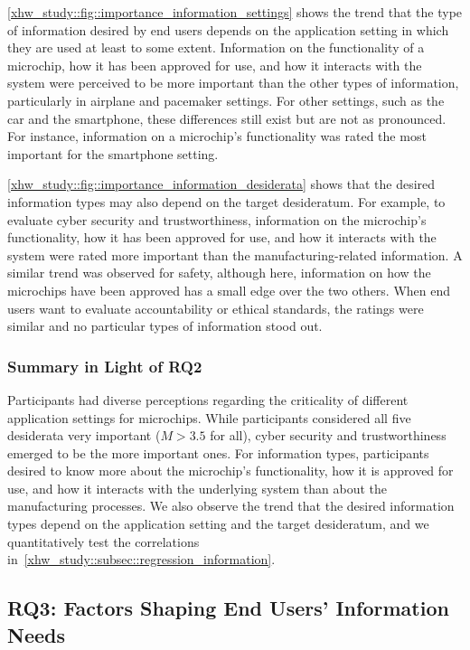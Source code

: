 \autoref{xhw_study::fig::importance_information_settings} shows the trend that the type of information desired by end users depends on the application setting in which they are used at least to some extent. Information on the functionality of a microchip, how it has been approved for use, and how it interacts with the system were perceived to be more important than the other types of information, particularly in airplane and pacemaker settings.
For other settings, such as the car and the smartphone, these differences still exist but are not as pronounced. For instance, information on a microchip's functionality was rated the most important for the smartphone setting.

\autoref{xhw_study::fig::importance_information_desiderata} shows that the desired information types may also depend on the target desideratum.
For example, to evaluate cyber security and trustworthiness, information on the microchip's functionality, how it has been approved for use, and how it interacts with the system were rated more important than the manufacturing-related information.
A similar trend was observed for safety, although here, information on how the microchips have been approved has a small edge over the two others.
When end users want to evaluate accountability or ethical standards, the ratings were similar and no particular types of information stood out.

\begin{tcolorbox}
\subsubsection*{Summary in Light of RQ2} 
Participants had diverse perceptions regarding the criticality of different application settings for microchips. 
While participants considered all five desiderata very important ($M$$>$$3.5$ for all), cyber security and trustworthiness emerged to be the more important ones.
For information types, participants desired to know more about the microchip's functionality, how it is approved for use, and how it interacts with the underlying system than about the manufacturing processes. 
We also observe the trend that the desired information types depend on the application setting and the target desideratum, and we quantitatively test the correlations in~\autoref{xhw_study::subsec::regression_information}.
\end{tcolorbox}

\subsection{RQ3: Factors Shaping End Users' Information Needs}
\label{xhw_study::subsec::regression_information}

